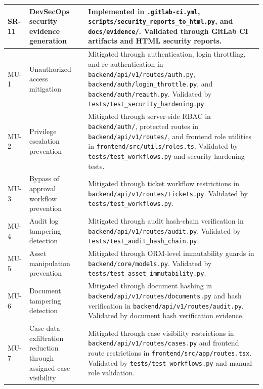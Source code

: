 \documentclass[12pt,a4paper]{report}
\begin{document}
\begin{longtable}{|p{1.1cm}|p{5.0cm}|p{9.0cm}|}
SR-11 & DevSecOps security evidence generation &
Implemented in \texttt{.gitlab-ci.yml}, \texttt{scripts/security\_reports\_to\_html.py}, and \texttt{docs/evidence/}. Validated through GitLab CI artifacts and HTML security reports. \\
\hline

MU-1 & Unauthorized access mitigation &
Mitigated through authentication, login throttling, and re-authentication in \texttt{backend/api/v1/routes/auth.py}, \texttt{backend/auth/login\_throttle.py}, and \texttt{backend/auth/reauth.py}. Validated by \texttt{tests/test\_security\_hardening.py}. \\
\hline

MU-2 & Privilege escalation prevention &
Mitigated through server-side RBAC in \texttt{backend/auth/}, protected routes in \texttt{backend/api/v1/routes/}, and frontend role utilities in \texttt{frontend/src/utils/roles.ts}. Validated by \texttt{tests/test\_workflows.py} and security hardening tests. \\
\hline

MU-3 & Bypass of approval workflow prevention &
Mitigated through ticket workflow restrictions in \texttt{backend/api/v1/routes/tickets.py}. Validated by \texttt{tests/test\_workflows.py}. \\
\hline

MU-4 & Audit log tampering detection &
Mitigated through audit hash-chain verification in \texttt{backend/api/v1/routes/audit.py}. Validated by \texttt{tests/test\_audit\_hash\_chain.py}. \\
\hline

MU-5 & Asset manipulation prevention &
Mitigated through ORM-level immutability guards in \texttt{backend/core/models.py}. Validated by \texttt{tests/test\_asset\_immutability.py}. \\
\hline

MU-6 & Document tampering detection &
Mitigated through document hashing in \texttt{backend/api/v1/routes/documents.py} and hash verification in \texttt{backend/api/v1/routes/audit.py}. Validated by document hash verification evidence. \\
\hline

MU-7 & Case data exfiltration reduction through assigned-case visibility &
Mitigated through case visibility restrictions in \texttt{backend/api/v1/routes/cases.py} and frontend route restrictions in \texttt{frontend/src/app/routes.tsx}. Validated by \texttt{tests/test\_workflows.py} and manual role validation. \\
\hline


\end{longtable}
\end{document}
